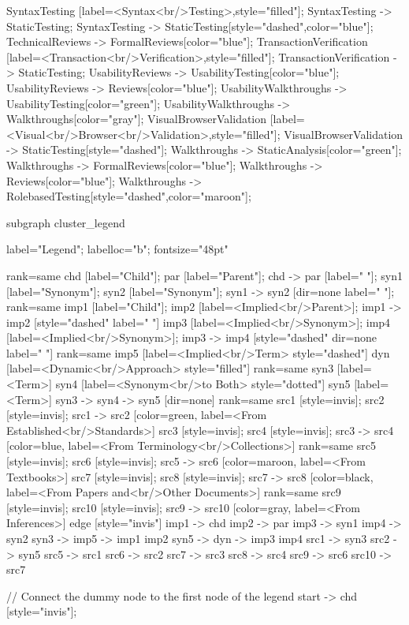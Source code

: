 \documentclass{article}
\begin{document}
{SyntaxTesting [label=<Syntax<br/>Testing>,style="filled"];
SyntaxTesting -> StaticTesting;
SyntaxTesting -> StaticTesting[style="dashed",color="blue"];
TechnicalReviews -> FormalReviews[color="blue"];
TransactionVerification [label=<Transaction<br/>Verification>,style="filled"];
TransactionVerification -> StaticTesting;
UsabilityReviews -> UsabilityTesting[color="blue"];
UsabilityReviews -> Reviews[color="blue"];
UsabilityWalkthroughs -> UsabilityTesting[color="green"];
UsabilityWalkthroughs -> Walkthroughs[color="gray"];
VisualBrowserValidation [label=<Visual<br/>Browser<br/>Validation>,style="filled"];
VisualBrowserValidation -> StaticTesting[style="dashed"];
Walkthroughs -> StaticAnalysis[color="green"];
Walkthroughs -> FormalReviews[color="blue"];
Walkthroughs -> Reviews[color="blue"];
Walkthroughs -> RolebasedTesting[style="dashed",color="maroon"];

subgraph cluster_legend {

    label="Legend";
    labelloc="b";
    fontsize="48pt"

    {
        rank=same
        chd [label="Child"];
        par [label="Parent"];
        chd -> par [label="                "];
        syn1 [label="Synonym"];
        syn2 [label="Synonym"];
        syn1 -> syn2 [dir=none label="                "];
    }
    {
        rank=same
        imp1 [label="Child"];
        imp2 [label=<Implied<br/>Parent>];
        imp1 -> imp2 [style="dashed" label="                "]
        imp3 [label=<Implied<br/>Synonym>];
        imp4 [label=<Implied<br/>Synonym>];
        imp3 -> imp4 [style="dashed" dir=none label="                "]
    }
    {
        rank=same
        imp5 [label=<Implied<br/>Term> style="dashed"]
        dyn [label=<Dynamic<br/>Approach> style="filled"]
    }
    {
        rank=same
        syn3 [label=<Term>]
        syn4 [label=<Synonym<br/>to Both> style="dotted"]
        syn5 [label=<Term>]
        syn3 -> syn4 -> syn5 [dir=none]
    }
{
rank=same
src1 [style=invis];
src2 [style=invis];
src1 -> src2 [color=green, label=<From Established<br/>Standards>]
src3 [style=invis];
src4 [style=invis];
src3 -> src4 [color=blue, label=<From Terminology<br/>Collections>]
}
{
rank=same
src5 [style=invis];
src6 [style=invis];
src5 -> src6 [color=maroon, label=<From Textbooks>]
src7 [style=invis];
src8 [style=invis];
src7 -> src8 [color=black, label=<From Papers and<br/>Other Documents>]
}
{
rank=same
src9 [style=invis];
src10 [style=invis];
src9 -> src10 [color=gray, label=<From Inferences>]
}
edge [style="invis"]
imp1 -> chd
imp2 -> par
imp3 -> syn1
imp4 -> syn2
syn3 -> imp5 -> { imp1 imp2 }
syn5 -> dyn -> { imp3 imp4 }
src1 -> syn3
src2 -> syn5
src5 -> src1
src6 -> src2
src7 -> src3
src8 -> src4
src9 -> src6
src10 -> src7
}

// Connect the dummy node to the first node of the legend
start -> chd [style="invis"];
}
\end{document}
